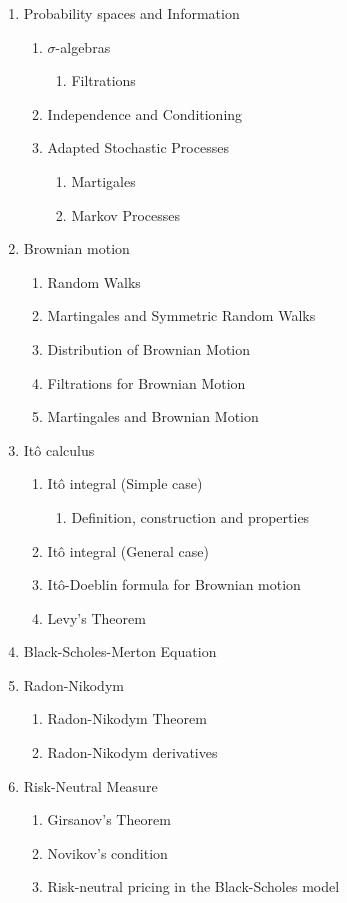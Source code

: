 \documentclass[reqno,a4paper,12pt]{amsart}%
\numberwithin{equation}{section}
\theoremstyle{definition}
\begin{document}
\begin{enumerate}
	\item Probability spaces and Information
	\begin{enumerate}
		\item $\sigma$-algebras
		\begin{enumerate}
			\item Filtrations
		\end{enumerate}
		\item Independence and Conditioning
		\item Adapted Stochastic Processes
		\begin{enumerate}
			\item Martigales
			\item Markov Processes
		\end{enumerate}
	\end{enumerate}
	\item Brownian motion
	\begin{enumerate}
		\item Random Walks
		\item Martingales and Symmetric Random Walks
		\item Distribution of Brownian Motion
		\item Filtrations for Brownian Motion
		\item Martingales and Brownian Motion
	\end{enumerate}
	\item It\^{o} calculus
	\begin{enumerate}
		\item It\^{o} integral (Simple case)
		\begin{enumerate}
			\item Definition, construction and properties
		\end{enumerate}
		\item It\^{o} integral (General case)
		\item It\^{o}-Doeblin formula for Brownian motion
		\item Levy's Theorem
	\end{enumerate}
	\item Black-Scholes-Merton Equation 
	\item Radon-Nikodym 
	\begin{enumerate}
		\item Radon-Nikodym Theorem
		\item Radon-Nikodym derivatives
	\end{enumerate}
	\item Risk-Neutral Measure
	\begin{enumerate}
		\item Girsanov's Theorem
		\item Novikov's condition
		\item Risk-neutral pricing in the Black-Scholes model
	\end{enumerate}
\end{enumerate}
	 
\end{document}
